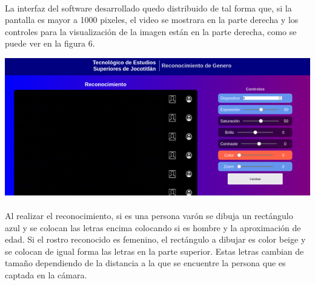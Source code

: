 \documentclass[9pt]{report}
\newenvironment{Figura}
  {\par\medskip\noindent\minipage{\linewidth}}
  {\endminipage\par\medskip}
\begin{document}
\begin{multicols}{2}
	\paragraph{}
	La interfaz del software desarrollado quedo distribuido de tal forma que, si la pantalla es mayor a 1000 pixeles, el video se mostrara en la parte derecha y los controles para la visualización de la imagen están en la parte derecha, como se puede ver en la figura 6.
	\begin{Figura}
		\includegraphics[width=\textwidth]{5}
		\label{figura6}
	\end{Figura}
	\paragraph{}
	Al realizar el reconocimiento, si es una persona varón se dibuja un rectángulo azul y se colocan las letras encima colocando si es hombre y la aproximación de edad. Si el rostro reconocido es femenino, el rectángulo a dibujar es color beige y se colocan de igual forma las letras en la parte superior. Estas letras cambian de tamaño dependiendo de la distancia a la que se encuentre la persona que es captada en la cámara.

\end{multicols}
\end{document}
